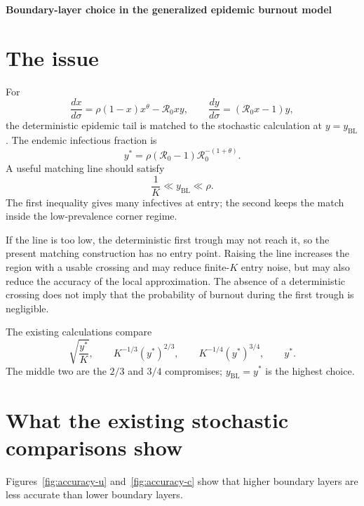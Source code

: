 \documentclass[11pt]{article}
\newcommand{\Rzero}{\mathcal R_0}
\newcommand{\yBL}{y_{\mathrm{BL}}}
\newcommand{\ystar}{y^*}
\begin{document}
\begin{center}
{\Large\bfseries Boundary-layer choice in the generalized epidemic burnout model}
\end{center}
\vspace{0.6em}

\section{The issue}

For
\begin{equation}
 \frac{dx}{d\sigma}=\rho(1-x)x^\theta-\Rzero xy,
 \qquad
 \frac{dy}{d\sigma}=(\Rzero x-1)y,
\end{equation}
the deterministic epidemic tail is matched to the stochastic calculation at
$y=\yBL$. The endemic infectious fraction is
\begin{equation}
 \ystar=\rho(\Rzero-1)\Rzero^{-(1+\theta)}.
\end{equation}
A useful matching line should satisfy
\begin{equation}
 \frac{1}{K}\ll\yBL\ll\rho.
\end{equation}
The first inequality gives many infectives at entry; the second keeps the match
inside the low-prevalence corner regime.

If the line is too low, the deterministic first trough may not reach it, so the
present matching construction has no entry
point. Raising the line increases the region with a usable crossing and may
reduce finite-$K$ entry noise, but may also reduce the accuracy of the local
approximation. The absence of a deterministic
crossing does not imply that the probability of burnout during the first trough
is negligible.

The existing calculations compare
\begin{equation}
 \sqrt{\frac{\ystar}{K}},\qquad
 K^{-1/3}(\ystar)^{2/3},\qquad
 K^{-1/4}(\ystar)^{3/4},\qquad
 \ystar.
\end{equation}
The middle two are the $2/3$ and $3/4$ compromises; $\yBL=\ystar$ is the
highest choice.

\section{What the existing stochastic comparisons show}

Figures~\ref{fig:accuracy-u} and~\ref{fig:accuracy-c} show that higher boundary
layers are less accurate than lower boundary layers.
\end{document}
